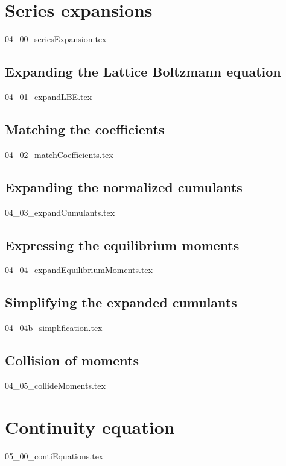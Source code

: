 \documentclass[12pt,a4paper,twoside]{article}
\begin{document}
\newpage
\section{Series expansions}
\label{sec: Series expansions}
{04_00_seriesExpansion.tex}


\subsection{Expanding the Lattice Boltzmann equation}
\label{sub: Expanding the Lattice Boltzmann equation}
{04_01_expandLBE.tex}

\subsection{Matching the coefficients}
\label{sub: Matching the coefficients}
{04_02_matchCoefficients.tex}

\subsection{Expanding the normalized cumulants}
\label{sub: Expanding the normalized cumulants}
{04_03_expandCumulants.tex}

\subsection{Expressing the equilibrium moments}
\label{sub: Expressing the equilibrium moments}
{04_04_expandEquilibriumMoments.tex}

\subsection{Simplifying the expanded cumulants}
\label{sub: Simplifying the expanded cumulants}
{04_04b_simplification.tex}

\subsection{Collision of moments}
\label{sub: Collision of moments}
{04_05_collideMoments.tex}

\newpage
\section{Continuity equation}
\label{sec: Continuity equation}
{05_00_contiEquations.tex}
\end{document}
